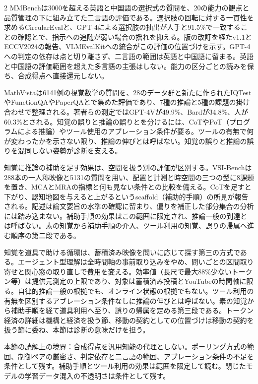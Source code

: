 \documentclass[lualatex,a4paper,10pt]{jlreq}
\begin{document}
\begin{multicols}{2}
\noindent MMBenchは3000を超える英語と中国語の選択式の質問を、20の能力の観点と品質管理の下に組み立てた二言語の評価である。選択肢の回転に対する一貫性を求めるCircularEvalと、GPT-4による選択肢の抽出が人手と91.5\%で一致することの確認とで、指示への追随が弱い場合の揺れを抑える。版の改訂を経たv1.1とECCV2024の報告、VLMEvalKitへの統合がこの評価の位置づけを示す。GPT-4への判定の依存は点と切り離さず、二言語の範囲は英語と中国語に留まる。英語と中国語の評価範囲を超えた多言語の主張はしない。能力の区分ごとの読みを保ち、合成得点へ直接還元しない。\autocite{vmd081}\par\medskip
\noindent MathVistaは6141例の視覚数学の質問を、28のデータ群と新たに作られたIQTestやFunctionQAやPaperQAとで集めた評価であり、7種の推論と5種の課題の掛け合わせで整理される。著者らの測定ではGPT-4Vが49.9\%、Bardが34.8\%、人が60.3\%とされる。知覚の誤りと推論の誤りとを分けるには、CoTやPoT（プログラムによる推論）やツール使用のアブレーション条件が要る。ツールの有無で何が変わったかを示さない限り、推論の伸びとは呼ばない。知覚の誤りと推論の誤りを混同しない姿勢が診断を支える。\autocite{vmd082}\par\medskip
\noindent 知覚に推論の補助を足す効果は、空間を扱う別の評価が区別する。VSI-Benchは288本の一人称映像と5131の質問を用い、配置と計測と時空間の三つの型に8課題を置き、MCAとMRAの指標と何も見ない条件との比較を備える。CoTを足すと下がり、認知地図を与えると上がるというscaffold（補助的手順）の所見が報告される。記述は論文要旨の水準の確認に留まり、偏りを補正した部分集合の分析には踏み込まない。補助手順の効果はこの範囲に限定され、推論一般の到達とは呼ばない。素の知覚から補助手順の介入、ツール利用の知覚、誤りの帰属へ進む順序の第二段である。\autocite{vmd111}\par\medskip
\noindent 知覚を道具で助ける循環は、蓄積済み映像を問いに応じて探す第三の方式である。エージェント型理解は全時間軸の事前取り込みをやめ、問いごとの区間取り寄せと関心窓の取り直しで費用を変える。効率値（長尺で最大88\%少ないトークン等）は提供元測定の上限であり、対象は蓄積済み投稿とYouTubeの時間軸に限る。自律的推論一般の根拠でも、オンライン状態の根拠でもない。ツール利用の有無を区別するアブレーション条件なしに推論の伸びとは呼ばない。素の知覚から補助手順を経て道具利用へ至り、誤りの帰属を定める第三段である。トークン経済の詳細は機構と経済を扱う節、移動の契約としての位置づけは移動の契約を扱う節に委ね、本節は診断の意味だけを担う。\autocite{vmd112}\par\medskip
\end{multicols}
\begin{claimboundary}[本節の読解上の境界]
\noindent 本節の読解上の境界：合成得点を汎用知能の代理としない。ポーリング方式の範囲、制御ペアの厳密さ、判定依存と二言語の範囲、アブレーション条件の不足を条件として残す。補助手順とツール利用の効果は範囲を限定して読む。閉じたモデルの学習データ混入の不透明さは条件として残す。\autocite{vmd080,vmd078,vmd079,vmd081,vmd082}\par
\end{claimboundary}
\end{document}
